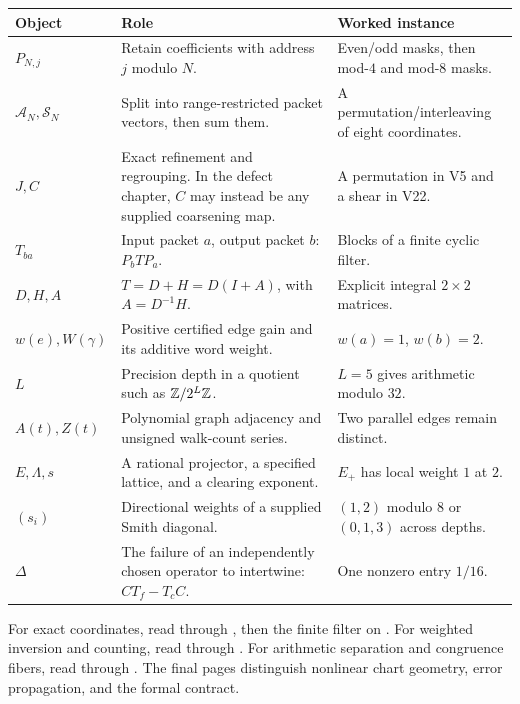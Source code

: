 {\small
\begin{tabularx}{\linewidth}{@{}p{.15\linewidth}Yp{.28\linewidth}@{}}\toprule
\textbf{Object} & \textbf{Role} & \textbf{Worked instance}\\\midrule
$P_{N,j}$ & Retain coefficients with address $j$ modulo $N$. & Even/odd masks, then mod-$4$ and mod-$8$ masks.\\
$\mathcal A_N,\mathcal S_N$ & Split into range-restricted packet vectors, then sum them. & A permutation/interleaving of eight coordinates.\\
$J,C$ & Exact refinement and regrouping. In the defect chapter, $C$ may instead be any supplied coarsening map. & A permutation in V5 and a shear in V22.\\
$T_{ba}$ & Input packet $a$, output packet $b$: $P_bTP_a$. & Blocks of a finite cyclic filter.\\
$D,H,A$ & $T=D+H=D(I+A)$, with $A=D^{-1}H$. & Explicit integral $2\times2$ matrices.\\
$w(e),W(\gamma)$ & Positive certified edge gain and its additive word weight. & $w(a)=1$, $w(b)=2$.\\
$L$ & Precision depth in a quotient such as $\mathbb Z/2^L\mathbb Z$. & $L=5$ gives arithmetic modulo $32$.\\
$A(t),Z(t)$ & Polynomial graph adjacency and unsigned walk-count series. & Two parallel edges remain distinct.\\
$E,\Lambda,s$ & A rational projector, a specified lattice, and a clearing exponent. & $E_+$ has local weight $1$ at $2$.\\
$(s_i)$ & Directional weights of a supplied Smith diagonal. & $(1,2)$ modulo $8$ or $(0,1,3)$ across depths.\\
$\Delta$ & The failure of an independently chosen operator to intertwine: $CT_f-T_cC$. & One nonzero entry $1/16$.\\\bottomrule
\end{tabularx}}

For exact coordinates, read  through , then the finite filter on . For weighted inversion and counting, read  through . For arithmetic separation and congruence fibers, read  through . The final pages distinguish nonlinear chart geometry, error propagation, and the formal contract.


